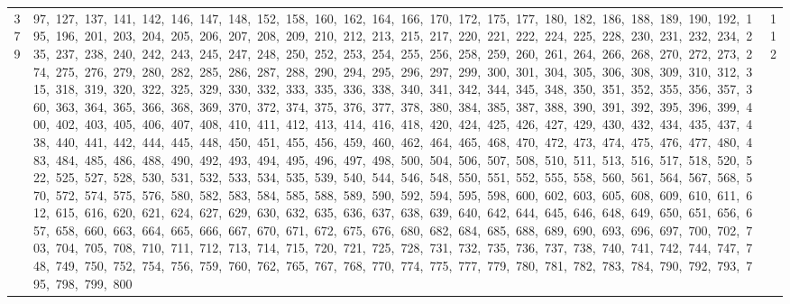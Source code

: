\begin{longtable}{c|p{}|r}
379 & 97,\ 127,\ 137,\ 141,\ 142,\ 146,\ 147,\ 148,\ 152,\ 158,\ 160,\ 162,\ 164,\ 166,\ 170,\ 172,\ 175,\ 177,\ 180,\ 182,\ 186,\ 188,\ 189,\ 190,\ 192,\ 195,\ 196,\ 201,\ 203,\ 204,\ 205,\ 206,\ 207,\ 208,\ 209,\ 210,\ 212,\ 213,\ 215,\ 217,\ 220,\ 221,\ 222,\ 224,\ 225,\ 228,\ 230,\ 231,\ 232,\ 234,\ 235,\ 237,\ 238,\ 240,\ 242,\ 243,\ 245,\ 247,\ 248,\ 250,\ 252,\ 253,\ 254,\ 255,\ 256,\ 258,\ 259,\ 260,\ 261,\ 264,\ 266,\ 268,\ 270,\ 272,\ 273,\ 274,\ 275,\ 276,\ 279,\ 280,\ 282,\ 285,\ 286,\ 287,\ 288,\ 290,\ 294,\ 295,\ 296,\ 297,\ 299,\ 300,\ 301,\ 304,\ 305,\ 306,\ 308,\ 309,\ 310,\ 312,\ 315,\ 318,\ 319,\ 320,\ 322,\ 325,\ 329,\ 330,\ 332,\ 333,\ 335,\ 336,\ 338,\ 340,\ 341,\ 342,\ 344,\ 345,\ 348,\ 350,\ 351,\ 352,\ 355,\ 356,\ 357,\ 360,\ 363,\ 364,\ 365,\ 366,\ 368,\ 369,\ 370,\ 372,\ 374,\ 375,\ 376,\ 377,\ 378,\ 380,\ 384,\ 385,\ 387,\ 388,\ 390,\ 391,\ 392,\ 395,\ 396,\ 399,\ 400,\ 402,\ 403,\ 405,\ 406,\ 407,\ 408,\ 410,\ 411,\ 412,\ 413,\ 414,\ 416,\ 418,\ 420,\ 424,\ 425,\ 426,\ 427,\ 429,\ 430,\ 432,\ 434,\ 435,\ 437,\ 438,\ 440,\ 441,\ 442,\ 444,\ 445,\ 448,\ 450,\ 451,\ 455,\ 456,\ 459,\ 460,\ 462,\ 464,\ 465,\ 468,\ 470,\ 472,\ 473,\ 474,\ 475,\ 476,\ 477,\ 480,\ 483,\ 484,\ 485,\ 486,\ 488,\ 490,\ 492,\ 493,\ 494,\ 495,\ 496,\ 497,\ 498,\ 500,\ 504,\ 506,\ 507,\ 508,\ 510,\ 511,\ 513,\ 516,\ 517,\ 518,\ 520,\ 522,\ 525,\ 527,\ 528,\ 530,\ 531,\ 532,\ 533,\ 534,\ 535,\ 539,\ 540,\ 544,\ 546,\ 548,\ 550,\ 551,\ 552,\ 555,\ 558,\ 560,\ 561,\ 564,\ 567,\ 568,\ 570,\ 572,\ 574,\ 575,\ 576,\ 580,\ 582,\ 583,\ 584,\ 585,\ 588,\ 589,\ 590,\ 592,\ 594,\ 595,\ 598,\ 600,\ 602,\ 603,\ 605,\ 608,\ 609,\ 610,\ 611,\ 612,\ 615,\ 616,\ 620,\ 621,\ 624,\ 627,\ 629,\ 630,\ 632,\ 635,\ 636,\ 637,\ 638,\ 639,\ 640,\ 642,\ 644,\ 645,\ 646,\ 648,\ 649,\ 650,\ 651,\ 656,\ 657,\ 658,\ 660,\ 663,\ 664,\ 665,\ 666,\ 667,\ 670,\ 671,\ 672,\ 675,\ 676,\ 680,\ 682,\ 684,\ 685,\ 688,\ 689,\ 690,\ 693,\ 696,\ 697,\ 700,\ 702,\ 703,\ 704,\ 705,\ 708,\ 710,\ 711,\ 712,\ 713,\ 714,\ 715,\ 720,\ 721,\ 725,\ 728,\ 731,\ 732,\ 735,\ 736,\ 737,\ 738,\ 740,\ 741,\ 742,\ 744,\ 747,\ 748,\ 749,\ 750,\ 752,\ 754,\ 756,\ 759,\ 760,\ 762,\ 765,\ 767,\ 768,\ 770,\ 774,\ 775,\ 777,\ 779,\ 780,\ 781,\ 782,\ 783,\ 784,\ 790,\ 792,\ 793,\ 795,\ 798,\ 799,\ 800 & 112 \\

\end{longtable}
